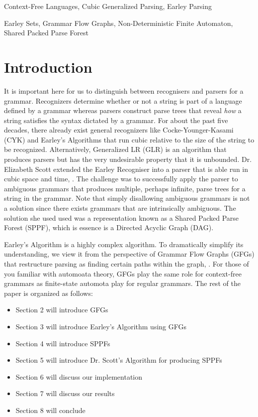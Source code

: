 \documentclass{sigplanconf}
\begin{document}

\terms
Context-Free Languages, Cubic Generalized Parsing, Earley Parsing 

\keywords
Earley Sets, Grammar Flow Graphs, Non-Deterministic Finite Automaton, Shared Packed Parse Forest

\section{Introduction}
It is important here for us to distinguish between recognisers and parsers for a grammar. Recognizers determine whether or not a string is part of a language defined by a grammar whereas parsers construct parse trees that reveal \textit{how} a string satisfies the syntax dictated by a grammar. For about the past five decades, there already exist general recognizers like Cocke-Younger-Kasami (CYK) and Earley's Algorithms that run cubic relative to the size of the string to be recognized. Alternatively, Generalized LR (GLR) is an algorithm that produces parsers but has the very undesirable property that it is unbounded. Dr. Elizabeth Scott extended the Earley Recogniser into a parser that is able run in cubic space and time, \cite{scott}. The challenge was to successfully apply the parser to ambiguous grammars that produces multiple, perhaps infinite, parse trees for a string in the grammar. Note that simply disallowing ambiguous grammars is not a solution since there exists grammars that are intrinsically ambiguous. The solution she used used was a representation known as a Shared Packed Parse Forest (SPPF), which is essence is a Directed Acyclic Graph (DAG).

Earley's Algorithm is a highly complex algorithm. To dramatically simplify its understanding, we view it from the perspective of Grammar Flow Graphs (GFGs) that restructure parsing as finding certain paths within the graph, \cite{bilardi-pingali}. For those of you familiar with automoata theory, GFGs play the same role for context-free grammars as finite-state automota play for regular grammars. The rest of the paper is organized as follows:
\begin{itemize}
\item Section 2 will introduce GFGs
\item Section 3 will introduce Earley's Algorithm using GFGs
\item Section 4 will introduce SPPFs
\item Section 5 will introduce Dr. Scott's Algorithm for producing SPPFs
\item Section 6 will discuss our implementation
\item Section 7 will discuss our results
\item Section 8 will conclude
\end{itemize}
\appendix
\end{document}
